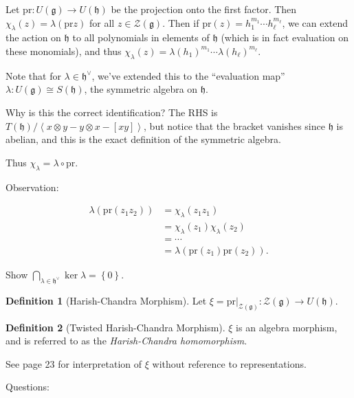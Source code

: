 \documentclass[11pt]{scrartcl}
\theoremstyle{definition}
\theoremstyle{theorem}
\theoremstyle{proof}
\theoremstyle{definition}
\newtheorem{definition}{Definition}[theorem]
\theoremstyle{break}
\theoremstyle{problem}
\providecommand{\tightlist}{%
  \setlength{\itemsep}{0pt}\setlength{\parskip}{0pt}}
\newcommand{\dual}[0]{^\vee}
\newcommand{\generators}[1]{\left\langle{#1}\right\rangle}
\newcommand{\intersect}[0]{\bigcap}
\newcommand{\lieg}[0]{{\mathfrak{g}}}
\newcommand{\lieh}[0]{{\mathfrak{h}}}
\newcommand{\mcz}[0]{{\mathcal{Z}}}
\newcommand{\restrictionof}[2]{{\left.{#1}\right|_{#2}}}
\newcommand{\tensor}[0]{\otimes}
\newcommand{\theset}[1]{\left\{{#1}\right\}}
\renewcommand{\to}[0]{\longrightarrow}
\begin{document}
Let \(\mathrm{pr}: U(\lieg) \to U(\lieh)\) be the projection onto the
first factor. Then \(\chi_\lambda(z) = \lambda(\mathrm{pr} z)\) for all
\(z\in \mcz(\lieg)\). Then if
\(\mathrm{pr}(z) = h_1^{m_1} \cdots h_\ell^{m_\ell}\), we can extend the
action on \(\lieh\) to all polynomials in elements of \(\lieh\) (which
is in fact evaluation on these monomials), and thus
\(\chi_\lambda(z) = \lambda(h_1)^{m_1} \cdots \lambda(h_\ell)^{m_\ell}\).

Note that for \(\lambda \in \lieh\dual\), we've extended this to the
``evaluation map'' \(\lambda: U(\lieg) \cong S(\lieh)\), the symmetric
algebra on \(\lieh\).

Why is this the correct identification? The RHS is
\(T(\lieh) / \generators{x\tensor y - y\tensor x - [xy]}\), but notice
that the bracket vanishes since \(\lieh\) is abelian, and this is the
exact definition of the symmetric algebra.

Thus \(\chi_\lambda = \lambda \circ \mathrm{pr}\).

Observation:

\begin{align*}
\lambda(\mathrm{pr}(z_1 z_2))
&= \chi_\lambda(z_1 z_1)\\
&= \chi_\lambda(z_1) \chi_\lambda(z_2) \\
&= \cdots \\
&= \lambda( \mathrm{pr}(z_1) \mathrm{pr}(z_2) )
.\end{align*}

\begin{description}
\tightlist
\item[Exercise]
Show \(\intersect_{\lambda \in \lieh\dual} \ker \lambda = \theset{0}\).
\end{description}

\begin{definition}[Harish-Chandra Morphism]

Let
\(\xi = \restrictionof{\mathrm{pr}}{\mcz(\lieg)}: \mcz(\lieg) \to U(\lieh)\).\end{definition}

\begin{definition}[Twisted Harish-Chandra Morphism]

\(\xi\) is an algebra morphism, and is referred to as the
\emph{Harish-Chandra homomorphism}.\end{definition}

See page 23 for interpretation of \(\xi\) without reference to
representations.

Questions:
\end{document}
